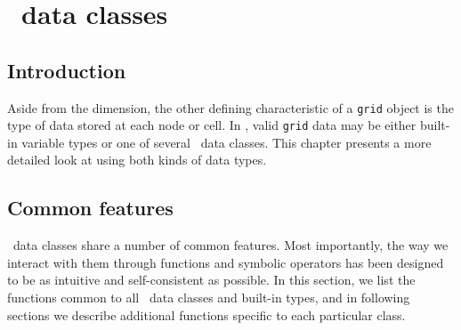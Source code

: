 
\chapter{\MMSP\ data classes}

\section{Introduction}
Aside from the dimension, the other defining characteristic of a {\tt grid} object is the type of data stored at each node or cell.  In \MMSP, valid {\tt grid} data may be either built-in variable types or one of several \MMSP\ data classes.  This chapter presents a more detailed look at using both kinds of data types.

\section{Common features}
\MMSP\ data classes share a number of common features.  Most importantly, the way we interact with them through functions and symbolic operators has been designed to be as intuitive and self-consistent as possible.  In this section, we list the functions common to all \MMSP\ data classes and built-in types, and in following sections we describe additional functions specific to each particular class.

